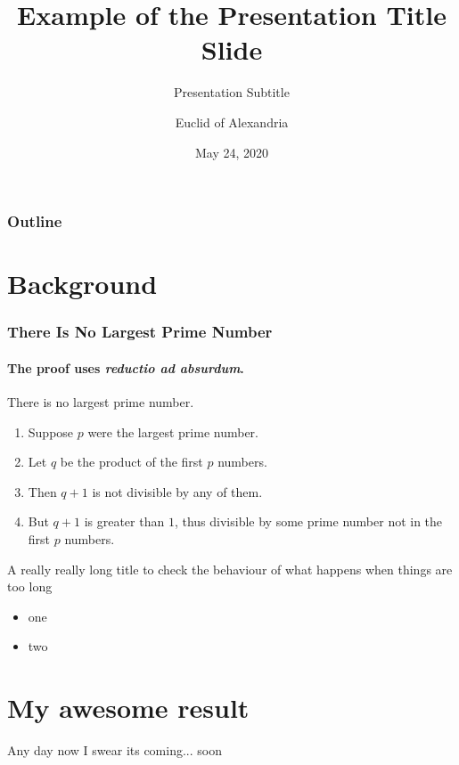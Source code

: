 \documentclass[aspectratio=169]{beamer}
\title{Example of the Presentation Title Slide}
\subtitle{Presentation Subtitle}
\date[ISPN ’80]{May 24, 2020}
\author[Euclid]{Euclid of Alexandria}
\begin{document}
\begin{frame}
\titlepage
\end{frame}

\begin{frame}
\frametitle{Outline}
\tableofcontents
\end{frame}

\section{Background}

\begin{frame} 
\frametitle{There Is No Largest Prime Number} 
\framesubtitle{The proof uses \textit{reductio ad absurdum}.} 
\begin{theorem}
There is no largest prime number. \end{theorem} 
\begin{enumerate} 
\item<1-| alert@1> Suppose $p$ were the largest prime number. 
\item<2-> Let $q$ be the product of the first $p$ numbers. 
\item<3-> Then $q+1$ is not divisible by any of them. 
\item<1-> But $q + 1$ is greater than $1$, thus divisible by some prime
number not in the first $p$ numbers.
\end{enumerate}
\end{frame}

\begin{frame}{A really really long title to check the behaviour of what happens when things are too long}
\begin{itemize}
\item one
\item two
\end{itemize}
\end{frame}

\section{My awesome result}
\begin{frame}{Any day now}
	I swear its coming... soon
\end{frame}
\end{document}
